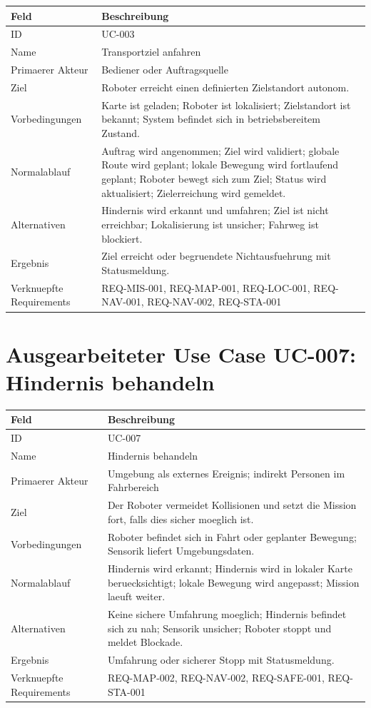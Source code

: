 \begin{longtable}{L{0.24\textwidth} L{0.64\textwidth}}
\toprule
Feld & Beschreibung \\
\midrule
ID & UC-003 \\
Name & Transportziel anfahren \\
Primaerer Akteur & Bediener oder Auftragsquelle \\
Ziel & Roboter erreicht einen definierten Zielstandort autonom. \\
Vorbedingungen & Karte ist geladen; Roboter ist lokalisiert; Zielstandort ist bekannt; System befindet sich in betriebsbereitem Zustand. \\
Normalablauf & Auftrag wird angenommen; Ziel wird validiert; globale Route wird geplant; lokale Bewegung wird fortlaufend geplant; Roboter bewegt sich zum Ziel; Status wird aktualisiert; Zielerreichung wird gemeldet. \\
Alternativen & Hindernis wird erkannt und umfahren; Ziel ist nicht erreichbar; Lokalisierung ist unsicher; Fahrweg ist blockiert. \\
Ergebnis & Ziel erreicht oder begruendete Nichtausfuehrung mit Statusmeldung. \\
Verknuepfte Requirements & REQ-MIS-001, REQ-MAP-001, REQ-LOC-001, REQ-NAV-001, REQ-NAV-002, REQ-STA-001 \\
\bottomrule
\end{longtable}

\section{Ausgearbeiteter Use Case UC-007: Hindernis behandeln}

\begin{longtable}{L{0.24\textwidth} L{0.64\textwidth}}
\toprule
Feld & Beschreibung \\
\midrule
ID & UC-007 \\
Name & Hindernis behandeln \\
Primaerer Akteur & Umgebung als externes Ereignis; indirekt Personen im Fahrbereich \\
Ziel & Der Roboter vermeidet Kollisionen und setzt die Mission fort, falls dies sicher moeglich ist. \\
Vorbedingungen & Roboter befindet sich in Fahrt oder geplanter Bewegung; Sensorik liefert Umgebungsdaten. \\
Normalablauf & Hindernis wird erkannt; Hindernis wird in lokaler Karte beruecksichtigt; lokale Bewegung wird angepasst; Mission laeuft weiter. \\
Alternativen & Keine sichere Umfahrung moeglich; Hindernis befindet sich zu nah; Sensorik unsicher; Roboter stoppt und meldet Blockade. \\
Ergebnis & Umfahrung oder sicherer Stopp mit Statusmeldung. \\
Verknuepfte Requirements & REQ-MAP-002, REQ-NAV-002, REQ-SAFE-001, REQ-STA-001 \\
\bottomrule
\end{longtable}
